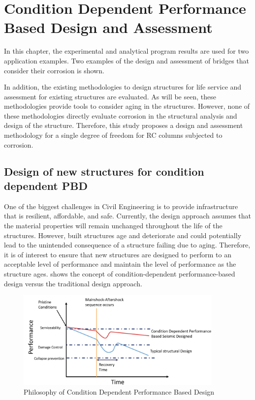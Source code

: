 \chapter{Condition Dependent Performance Based Design and Assessment}

\label{chap-six}

In this chapter, the experimental and analytical program results are used for two application examples. Two examples of the design and assessment of bridges that consider their corrosion is shown.

In addition, the existing methodologies to design structures for life service and assessment for existing structures are evaluated. As will be seen, these methodologies provide tools to consider aging in the structures. However, none of these methodologies directly evaluate corrosion in the structural analysis and design of the structure. Therefore, this study proposes a design and assessment methodology for a single degree of freedom for RC columns subjected to corrosion.

\section{Design of new structures for condition dependent PBD}

One of the biggest challenges in Civil Engineering is to provide infrastructure that is resilient, affordable, and safe. Currently, the design approach assumes that the material properties will remain unchanged throughout the life of the structures. However, built structures age and deteriorate and could potentially lead to the unintended consequence of a structure failing due to aging. Therefore, it is of interest to ensure that new structures are designed to perform to an acceptable level of performance and maintain the level of performance as the structure ages.  shows the concept of condition-dependent performance-based design versus the traditional design approach. 

\begin{figure}[htbp]
	\centering
	\includegraphics[width=0.9\textwidth]{VAC Thesis 2.0/Chapter-6/figs/CD_DDBD_Concept.png}
	\caption{Philosophy of Condition Dependent Performance Based Design}
	\label{fig:ConditionDependent PBD}
\end{figure}

